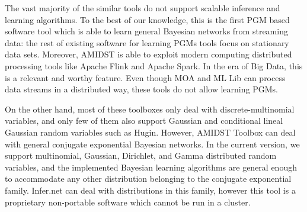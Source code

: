 \documentclass[10pt,a4paper]{article}
\begin{document}
The vast majority of the similar tools do not support scalable inference and learning algorithms. To the best of our knowledge, this is the first PGM based software tool which is able to learn general  Bayesian networks 
from streaming data:  the rest of existing software for learning PGMs tools focus on stationary data sets. Moreover, AMIDST is able to exploit modern computing distributed processing tools like Apache Flink and Apache Spark. In the era of Big Data, this is a relevant and worthy feature. Even though MOA and ML Lib can process data streams in a distributed way, these tools do not allow learning PGMs.  \newline 




On the other hand, most of these toolboxes only deal with discrete-multinomial variables, and only few of them also support Gaussian and conditional lineal Gaussian random variables such as Hugin. However, {AMIDST} Toolbox can deal with general conjugate exponential Bayesian networks. In the current version, we support multinomial, Gaussian, Dirichlet, and  Gamma distributed random variables, and the implemented Bayesian learning algorithms are general enough to accommodate any other distribution belonging to the conjugate exponential family. Infer.net can deal with distributions in this family, however this tool is a proprietary non-portable software which cannot be run in a cluster.\newline 
\end{document}
